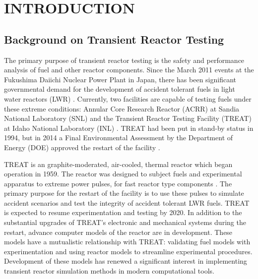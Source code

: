 %
%
%



\pagestyle{plain} %
\setcounter{page}{1}


\chapter{\uppercase{Introduction}}

\section{Background on Transient Reactor Testing}

The primary purpose of transient reactor testing is the safety and performance analysis of fuel and other reactor components. Since the March 2011 events at the Fukushima Daiichi Nuclear Power Plant in Japan, there has been significant governmental demand for the development of accident tolerant fuels in light water reactors (LWR) \cite{ConRepTREAT}.  Currently, two facilities are capable of testing fuels under these extreme conditions: Annular Core Research Reactor (ACRR) at Sandia National Laboratory (SNL) and the Transient Reactor Testing Facility (TREAT) at Idaho National Laboratory (INL) \cite{SandiaTREAT}. TREAT had been put in stand-by status in 1994, but in 2014 a Final Environmental Assessment by the Department of Energy (DOE) approved the restart of the facility \cite{FONSI}. 

TREAT is an graphite-moderated, air-cooled, thermal reactor which began operation in 1959.  The reactor was designed to subject fuels and experimental apparatus to extreme power pulses, for fast reactor type components \cite{TREATSummary}. The primary purpose for the restart of the facility is to use these pulses to simulate accident scenarios and test the integrity of accident tolerant LWR fuels. TREAT is expected to resume experimentation and testing by 2020.  In addition to the substantial upgrades of TREAT's electronic and mechanical systems during the restart, advance computer models of the reactor are in development.  These models have a mutualistic relationship with TREAT: validating fuel models with experimentation and using reactor models to streamline experimental procedures. Development of these models has renewed a significant interest in implementing transient reactor simulation methods in modern computational tools.

